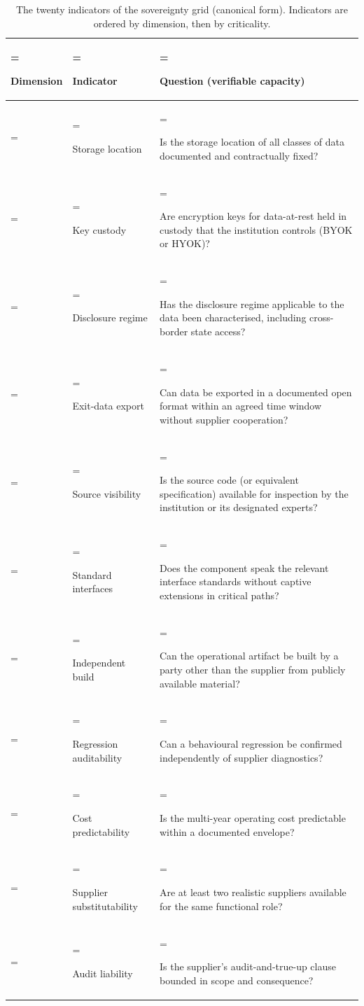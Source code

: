 \begin{table}[H]
\centering\small
\caption{The twenty indicators of the sovereignty grid (canonical
form). Indicators are ordered by dimension, then by criticality.}
\label{tab:sg-indicators}
\begin{tabularx}{\textwidth}{%
  >{\hsize=0.60\hsize\linewidth=\hsize\bfseries\raggedright\arraybackslash}X%
  >{\hsize=0.90\hsize\linewidth=\hsize\raggedright\arraybackslash}X%
  >{\hsize=1.50\hsize\linewidth=\hsize\raggedright\arraybackslash}X%
}
\toprule
Dimension & Indicator & Question (verifiable capacity) \\
\midrule
\multirow{4}{*}{\textbf{Data}}
  & Storage location & Is the storage location of all classes of data
    documented and contractually fixed? \\
  & Key custody & Are encryption keys for data-at-rest held in custody
    that the institution controls (BYOK or HYOK)? \\
  & Disclosure regime & Has the disclosure regime applicable to the
    data been characterised, including cross-border state access? \\
  & Exit-data export & Can data be exported in a documented open
    format within an agreed time window without supplier
    cooperation? \\
\addlinespace
\multirow{4}{*}{\textbf{Technical}}
  & Source visibility & Is the source code (or equivalent
    specification) available for inspection by the institution or its
    designated experts? \\
  & Standard interfaces & Does the component speak the relevant
    interface standards without captive extensions in critical paths? \\
  & Independent build & Can the operational artifact be built by a
    party other than the supplier from publicly available material? \\
  & Regression auditability & Can a behavioural regression be
    confirmed independently of supplier diagnostics? \\
\addlinespace
\multirow{4}{*}{\textbf{Financial}}
  & Cost predictability & Is the multi-year operating cost predictable
    within a documented envelope? \\
  & Supplier substitutability & Are at least two realistic suppliers
    available for the same functional role? \\
  & Audit liability & Is the supplier's audit-and-true-up clause
    bounded in scope and consequence? \\

\end{tabularx}
\end{table}
